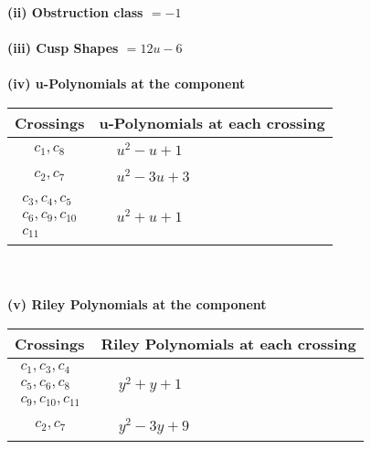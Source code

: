 \documentclass[1p]{elsarticle_modified}
\theoremstyle{definition}
\begin{document}
\flushleft \textbf{(ii) Obstruction class $= -1$}\\~\\
\flushleft \textbf{(iii) Cusp Shapes $= 12 u-6$}\\~\\
\newpage\renewcommand{\arraystretch}{1}
\flushleft \textbf{(iv) u-Polynomials at the component}\newline \\
\begin{tabular}{m{50pt}|m{274pt}}
Crossings & \hspace{64pt}u-Polynomials at each crossing \\
\hline $$\begin{aligned}c_{1},c_{8}\end{aligned}$$&$\begin{aligned}
&u^2- u+1
\end{aligned}$\\
\hline $$\begin{aligned}c_{2},c_{7}\end{aligned}$$&$\begin{aligned}
&u^2-3 u+3
\end{aligned}$\\
\hline $$\begin{aligned}c_{3},c_{4},c_{5}\\c_{6},c_{9},c_{10}\\c_{11}\end{aligned}$$&$\begin{aligned}
&u^2+u+1
\end{aligned}$\\
\hline
\end{tabular}\\~\\
\newpage\renewcommand{\arraystretch}{1}
\flushleft \textbf{(v) Riley Polynomials at the component}\newline \\
\begin{tabular}{m{50pt}|m{274pt}}
Crossings & \hspace{64pt}Riley Polynomials at each crossing \\
\hline $$\begin{aligned}c_{1},c_{3},c_{4}\\c_{5},c_{6},c_{8}\\c_{9},c_{10},c_{11}\end{aligned}$$&$\begin{aligned}
&y^2+y+1
\end{aligned}$\\
\hline $$\begin{aligned}c_{2},c_{7}\end{aligned}$$&$\begin{aligned}
&y^2-3 y+9
\end{aligned}$\\
\hline
\end{tabular}\\~\\
\end{document}
